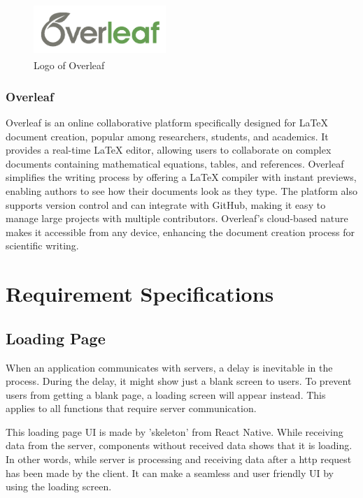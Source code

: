 \documentclass[conference]{IEEEtran}
\begin{document}
        \begin{figure}[htbp]
            \centerline{\includegraphics[width=5cm, height=2cm]{Images/logo/overleaf.png}}
            \caption{Logo of Overleaf}
            \label{fig}
        \end{figure}
        \subsubsection{Overleaf}
            Overleaf is an online collaborative platform specifically designed for LaTeX document creation, popular among researchers, students, and academics. It provides a real-time LaTeX editor, allowing users to collaborate on complex documents containing mathematical equations, tables, and references. Overleaf simplifies the writing process by offering a LaTeX compiler with instant previews, enabling authors to see how their documents look as they type. The platform also supports version control and can integrate with GitHub, making it easy to manage large projects with multiple contributors. Overleaf’s cloud-based nature makes it accessible from any device, enhancing the document creation process for scientific writing.
            
\section{Requirement Specifications}
    \subsection{Loading Page}
        When an application communicates with servers, a delay is inevitable in the process. During the delay, it might show just a blank screen to users. To prevent users from getting a blank page, a loading screen will appear instead. This applies to all functions that require server communication.

        This loading page UI is made by 'skeleton' from React Native. While receiving data from the server, components without received data shows that it is loading. In other words, while server is processing and receiving data after a http request has been made by the client. It can make a seamless and user friendly UI by using the loading screen. 
        
\end{document}
